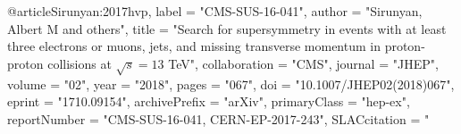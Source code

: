 @article{Sirunyan:2017hvp,
      label          = "CMS-SUS-16-041",
      author         = "Sirunyan, Albert M and others",
      title          = "{Search for supersymmetry in events with at least three
                        electrons or muons, jets, and missing transverse momentum
                        in proton-proton collisions at $ \sqrt{s}=13 $ TeV}",
      collaboration  = "CMS",
      journal        = "JHEP",
      volume         = "02",
      year           = "2018",
      pages          = "067",
      doi            = "10.1007/JHEP02(2018)067",
      eprint         = "1710.09154",
      archivePrefix  = "arXiv",
      primaryClass   = "hep-ex",
      reportNumber   = "CMS-SUS-16-041, CERN-EP-2017-243",
      SLACcitation   = "%
}


